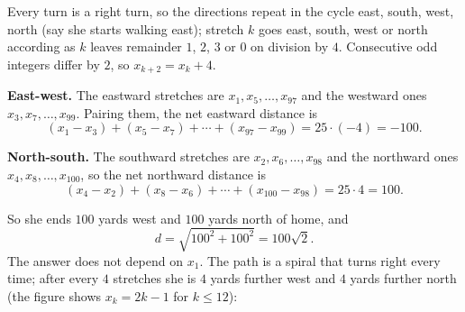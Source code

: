 Every turn is a right turn, so the directions repeat in the cycle east, south, west, north (say she starts walking east); stretch $k$ goes east, south, west or north according as $k$ leaves remainder $1$, $2$, $3$ or $0$ on division by $4$. Consecutive odd integers differ by $2$, so $x_{k+2}=x_k+4$.

\textbf{East-west.} The eastward stretches are $x_1,x_5,\dots,x_{97}$ and the westward ones $x_3,x_7,\dots,x_{99}$. Pairing them, the net eastward distance is
\[(x_1-x_3)+(x_5-x_7)+\cdots+(x_{97}-x_{99})=25\cdot(-4)=-100.\]

\textbf{North-south.} The southward stretches are $x_2,x_6,\dots,x_{98}$ and the northward ones $x_4,x_8,\dots,x_{100}$, so the net northward distance is
\[(x_4-x_2)+(x_8-x_6)+\cdots+(x_{100}-x_{98})=25\cdot4=100.\]

So she ends $100$ yards west and $100$ yards north of home, and
\[d=\sqrt{100^2+100^2}=\boxed{100\sqrt2}.\]
The answer does not depend on $x_1$. The path is a spiral that turns right every time; after every $4$ stretches she is $4$ yards further west and $4$ yards further north (the figure shows $x_k=2k-1$ for $k\le12$):

